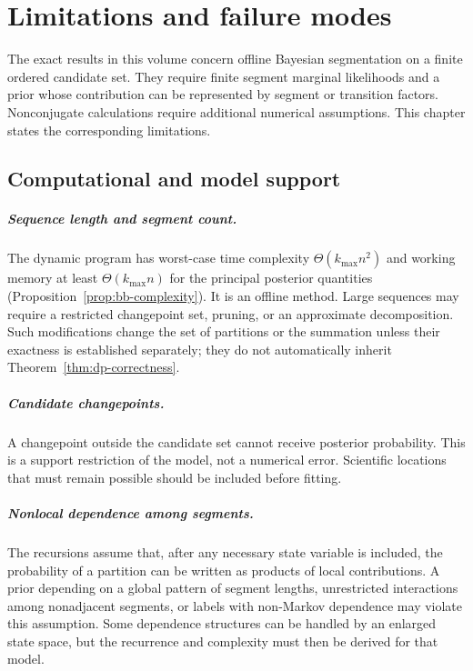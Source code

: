 \chapter[Limitations and failure modes]{Limitations and failure modes}
\label{ch:failures}

\label{sec:limitations}

The exact results in this volume concern offline Bayesian segmentation on a finite ordered
candidate set. They require finite segment marginal likelihoods and a prior whose contribution can
be represented by segment or transition factors. Nonconjugate calculations require additional
numerical assumptions. This chapter states the corresponding limitations.

\section{Computational and model support}
\paragraph{Sequence length and segment count.}
The dynamic program has worst-case time complexity $\Theta(k_{\max}n^2)$ and working memory at
least $\Theta(k_{\max}n)$ for the principal posterior quantities
(Proposition~\ref{prop:bb-complexity}). It is an offline method. Large sequences may require a
restricted changepoint set, pruning, or an approximate decomposition. Such modifications change the
set of partitions or the summation unless their exactness is established separately; they do not
automatically inherit Theorem~\ref{thm:dp-correctness}.

\paragraph{Candidate changepoints.}
A changepoint outside the candidate set cannot receive posterior probability. This is a support
restriction of the model, not a numerical error. Scientific locations that must remain possible
should be included before fitting.

\paragraph{Nonlocal dependence among segments.}
The recursions assume that, after any necessary state variable is included, the probability of a
partition can be written as products of local contributions. A prior depending on a global pattern
of segment lengths, unrestricted interactions among nonadjacent segments, or labels with
non-Markov dependence may violate this assumption. Some dependence structures can be handled by an
enlarged state space, but the recurrence and complexity must then be derived for that model.

